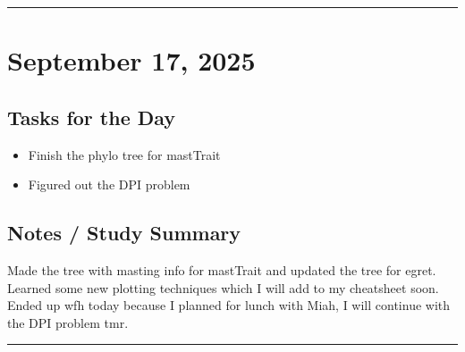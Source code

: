 \documentclass[12pt]{article}
\begin{document}
\vspace{1em}
\hrule
\vspace{1em}

\section*{September 17, 2025}

\subsection*{Tasks for the Day}
\begin{itemize}
    \item Finish the phylo tree for mastTrait
    \item Figured out the DPI problem
\end{itemize}
\subsection*{Notes / Study Summary}
Made the tree with masting info for mastTrait and updated the tree for egret. Learned some new plotting techniques which I will add to my cheatsheet soon.\\
Ended up wfh today because I planned for lunch with Miah, I will continue with the DPI problem tmr.

\vspace{1em}
\hrule
\vspace{1em}
\end{document}
